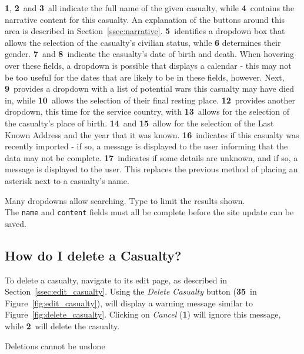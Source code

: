 \documentclass[12pt]{article}
\newcommand{\marker}[1]{\color{red}\textbf{#1}\color{black}}
\begin{document}
\marker{1}, \marker{2}\ and \marker{3}\ all indicate the full name of the given casualty, while \marker{4}\ contains the narrative content for this casualty. An explanation of the buttons around this area is described in Section~\ref{ssec:narrative}. \marker{5}\ identifies a dropdown box that allows the selection of the casualty's civilian status, while \marker{6} determines their gender. \marker{7}\ and \marker{8}\ indicate the casualty's date of birth and death. When hovering over these fields, a dropdown is possible that displays a calendar - this may not be too useful for the dates that are likely to be in these fields, however. Next, \marker{9}\ provides a dropdown with a list of potential wars this casualty may have died in, while \marker{10}\ allows the selection of their final resting place. \marker{12}\ provides another dropdown, this time for the service country, with \marker{13}\ allows for the selection of the casualty's place of birth. \marker{14}\ and \marker{15}\ allow for the selection of the Last Known Address and the year that it was known. \marker{16}\ indicates if this casualty was recently imported - if so, a message is displayed to the user informing that the data may not be complete. \marker{17}\ indicates if some details are unknown, and if so, a message is displayed to the user. This replaces the previous method of placing an asterisk next to a casualty's name.

\begin{infoBox}
Many dropdowns allow searching. Type to limit the results shown. \\
The \texttt{name} and \texttt{content} fields must all be complete before the site update can be saved.
\end{infoBox}

\newpage
\FloatBarrier
\subsection{How do I delete a Casualty?}\label{ssec:delete_casualty}
To delete a casualty, navigate to its edit page, as described in Section~\ref{ssec:edit_casualty}. Using the \textit{Delete Casualty} button (\marker{35}\ in Figure~\ref{fig:edit_casualty}), will display a warning message similar to Figure~\ref{fig:delete_casualty}. Clicking on \textit{Cancel} (\marker{1}) will ignore this message, while \marker{2}\ will delete the casualty.

\begin{warningBox}
Deletions cannot be undone
\end{warningBox}
\end{document}
